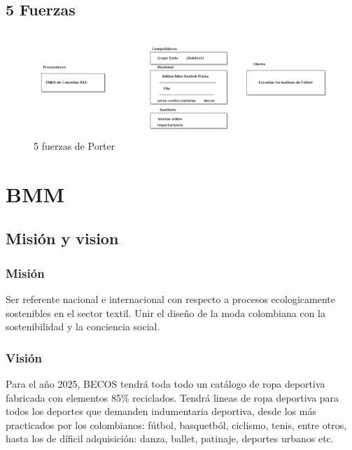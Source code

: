 \documentclass[11pt]{article}
\begin{document}
\subsection{5 Fuerzas}
\label{sec:orgb678fca}
\begin{figure}[htbp]
\centering
\includegraphics[width=.9\linewidth]{./assets/build/5_fuerzas.png}
\caption{\label{fig:org7c89b21}5 fuerzas de Porter}
\end{figure}

\section{BMM}
\label{sec:org090a46c}
\subsection{Misión y vision}
\label{sec:org7d9b109}
\subsubsection{Misión}
\label{sec:orgd83d000}
Ser referente nacional e internacional con respecto
a procesos ecologicamente sostenibles en el sector
textil. Unir el diseño de la moda colombiana
con la sostenibilidad y la conciencia social.

\subsubsection{Visión}
\label{sec:org5347890}

Para el año 2025, BECOS tendrá toda todo un catálogo de ropa deportiva
fabricada con elementos 85\% reciclados. Tendrá lineas de ropa deportiva para
todos los deportes que demanden indumentaria deportiva, desde los más
practicados por los colombianos: fútbol, basquetból, ciclismo, tenis, entre
otros, hasta los de díficil adquisición: danza, ballet, patinaje,
deportes urbanos etc.
\end{document}
